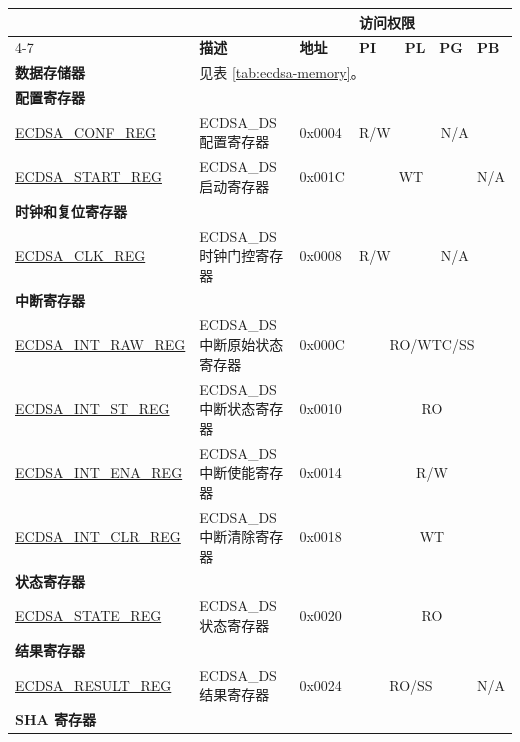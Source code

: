 \begin{longtable}{ | p{4.8cm} | l | p{1.3cm} | l | l | l | l | }
\hline
\rowcolor{lightgray}
 &  &   & \multicolumn{4}{|l|}{\textbf{访问权限}} \\\cline{4-7}
\rowcolor{lightgray}
\multirow{-2}{*}{\textbf{名称}} & \multirow{-2}{*}{\textbf{描述}}  &  \multirow{-2}{*}{\textbf{地址}} & \textbf{PI} & \textbf{PL} & \textbf{PG} & \textbf{PB} \\ \hline
\textbf{数据存储器} & \multicolumn{6}{|l|}{见表 \ref{tab:ecdsa-memory}。} \\ \hline
\multicolumn{7}{|l|}{\textbf{配置寄存器}} \\ \hline
\hyperref[regdesc:ECDSACONFREG]{ECDSA\_CONF\_REG} & ECDSA\_DS 配置寄存器 & 0x0004 & R/W & \multicolumn{3}{|c|}{N/A} \\ \hline
\hyperref[regdesc:ECDSASTARTREG]{ECDSA\_START\_REG} & ECDSA\_DS 启动寄存器 & 0x001C & \multicolumn{3}{|c|}{WT} & N/A \\ \hline
\multicolumn{7}{|l|}{\textbf{时钟和复位寄存器}} \\ \hline
\hyperref[regdesc:ECDSACLKREG]{ECDSA\_CLK\_REG} & ECDSA\_DS 时钟门控寄存器 & 0x0008 & R/W & \multicolumn{3}{|c|}{N/A} \\ \hline
\multicolumn{7}{|l|}{\textbf{中断寄存器}} \\ \hline
\hyperref[regdesc:ECDSAINTRAWREG]{ECDSA\_INT\_RAW\_REG} & ECDSA\_DS 中断原始状态寄存器 & 0x000C & \multicolumn{4}{|c|}{RO/WTC/SS} \\ \hline
\hyperref[regdesc:ECDSAINTSTREG]{ECDSA\_INT\_ST\_REG} & ECDSA\_DS 中断状态寄存器 & 0x0010 & \multicolumn{4}{|c|}{RO} \\ \hline
\hyperref[regdesc:ECDSAINTENAREG]{ECDSA\_INT\_ENA\_REG} & ECDSA\_DS 中断使能寄存器 & 0x0014 & \multicolumn{4}{|c|}{R/W} \\ \hline
\hyperref[regdesc:ECDSAINTCLRREG]{ECDSA\_INT\_CLR\_REG} & ECDSA\_DS 中断清除寄存器 & 0x0018 & \multicolumn{4}{|c|}{WT} \\ \hline
\multicolumn{7}{|l|}{\textbf{状态寄存器}} \\ \hline
\hyperref[regdesc:ECDSASTATEREG]{ECDSA\_STATE\_REG} & ECDSA\_DS 状态寄存器 & 0x0020 & \multicolumn{4}{|c|}{RO} \\ \hline
\multicolumn{7}{|l|}{\textbf{结果寄存器}} \\ \hline
\hyperref[regdesc:ECDSARESULTREG]{ECDSA\_RESULT\_REG} & ECDSA\_DS 结果寄存器 & 0x0024 & \multicolumn{3}{|c|}{RO/SS} & N/A \\ \hline
\multicolumn{7}{|l|}{\textbf{SHA 寄存器}} \\ \hline

\end{longtable}
